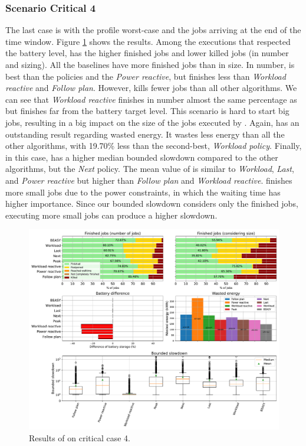 \clearpage

\subsubsection{Scenario Critical 4}

The last case is with the profile worst-case and the jobs arriving at the end of the time window. Figure \ref{fig:beasy_critical_4} shows the results. Among the executions that respected the battery level, \emph{\systemName} has the higher finished jobs and lower killed jobs (in number and sizing). All the baselines have more finished jobs than \emph{\systemName} in size. In number, \emph{\systemName} is best than the policies and the \emph{Power reactive}, but finishes less than \emph{Workload reactive} and \emph{Follow plan}. However, \emph{\systemName} kills fewer jobs than all other algorithms. We can see that \emph{Workload reactive} finishes in number almost the same percentage as \emph{\systemName} but finishes far from the battery target level. This scenario is hard to start big jobs, resulting in a big impact on the size of the jobs executed by \emph{\systemName}. Again, \emph{\systemName} has an outstanding result regarding wasted energy. It wastes less energy than all the other algorithms, with 19.70\% less than the second-best, \emph{Workload policy}. Finally, in this case, \emph{\systemName} has a higher median bounded slowdown compared to the other algorithms, but the \emph{Next} policy. The mean value of \emph{\systemName} is similar to \emph{Workload}, \emph{Last}, and \emph{Power reactive} but higher than \emph{Follow plan} and \emph{Workload reactive}. \emph{\systemName} finishes more small jobs due to the power constraints, in which the waiting time has higher importance. Since our bounded slowdown considers only the finished jobs, executing more small jobs can produce a higher slowdown.

\begin{figure}[!htb]
    \centering
    \includegraphics[scale=0.39]{Images/Heuristic/profile_worst_workload_2_with_noise.pdf}
    \caption{Results of \emph{\systemName} on critical case 4.}
    \label{fig:beasy_critical_4}
\end{figure}

